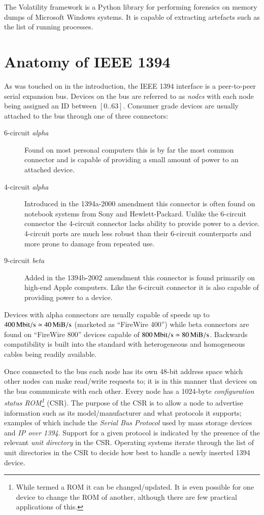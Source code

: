 \documentclass[numbers=noenddot,      %
               abstract,              %
               captions=tableheading, %
               DIV=8]                 %
              {scrartcl}
\begin{document}
The Volatility framework \citep{volatility10} is a Python library for
performing forensics on memory dumps of Microsoft Windows systems. It is
capable of extracting artefacts such as the list of running processes.

\section{Anatomy of IEEE 1394}
\label{sec:anatomy}

As was touched on in the introduction, the IEEE 1394 interface is a
peer-to-peer serial expansion bus. Devices on the bus are referred to as
\emph{nodes} with each node being assigned an ID between
$[0..63]$. Consumer grade devices are usually attached to the bus
through one of three connectors:

\begin{description}
\item [6-circuit \emph{alpha}] Found on most personal computers this is
  by far the most common connector and is capable of providing a small
  amount of power to an attached device.
\item [4-circuit \emph{alpha}] Introduced in the 1394a-2000 amendment
  this connector is often found on notebook systems from Sony and
  Hewlett-Packard. Unlike the 6-circuit connector the 4-circuit
  connector lacks ability to provide power to a device. 4-circuit ports
  are much less robust than their 6-circuit counterparts and more prone
  to damage from repeated use.
 \item [9-circuit \emph{beta}] Added in the 1394b-2002 amendment this
   connector is found primarily on high-end Apple computers. Like the
   6-circuit connector it is also capable of providing power to a
   device.
\end{description}

Devices with alpha connectors are usually capable of speeds up to
$\unit[400]{Mbit/s} \simeq \unit[40]{MiB/s}$ (marketed as ``FireWire
400'') while beta connectors are found on ``FireWire 800'' devices
capable of $\unit[800]{Mbit/s} \simeq \unit[80]{MiB/s}$. Backwards
compatibility is built into the standard with heterogeneous and
homogeneous cables being readily available.

Once connected to the bus each node has its own 48-bit address space
which other nodes can make read/write requests to; it is in this manner
that devices on the bus communicate with each other. Every node has a
1024-byte \emph{configuration status ROM\footnote{While termed a ROM it
    can be changed/updated. It is even possible for one device to change
    the ROM of another, although there are few practical applications of
    this.}} (CSR). The purpose of the CSR is to allow a node to
advertise information such as its model/manufacturer and what protocols
it supports; examples of which include the \emph{Serial Bus Protocol}
used by mass storage devices and \emph{IP over 1394}. Support for a
given protocol is indicated by the presence of the relevant \emph{unit
  directory} in the CSR. Operating systems iterate through the list of
unit directories in the CSR to decide how best to handle a newly
inserted 1394 device.
\end{document}
